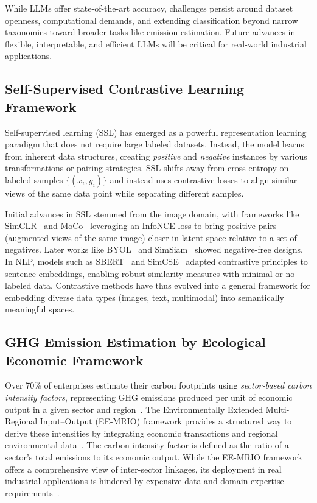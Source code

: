 While LLMs offer state-of-the-art accuracy, challenges persist around dataset openness, computational demands, and extending classification beyond narrow taxonomies toward broader tasks like emission estimation. Future advances in flexible, interpretable, and efficient LLMs will be critical for real-world industrial applications.

\subsection{Self-Supervised Contrastive Learning Framework}
Self-supervised learning (SSL) has emerged as a powerful representation learning paradigm that does not require large labeled datasets. Instead, the model learns from inherent data structures, creating \emph{positive} and \emph{negative} instances by various transformations or pairing strategies. SSL shifts away from cross-entropy on labeled samples \(\{(x_i,y_i)\}\) and instead uses contrastive losses to align similar views of the same data point while separating different samples.

Initial advances in SSL stemmed from the image domain, with frameworks like SimCLR~\cite{SimCLR} and MoCo~\cite{MoCo} leveraging an InfoNCE loss to bring positive pairs (augmented views of the same image) closer in latent space relative to a set of negatives. Later works like BYOL~\cite{contractiveBYOL} and SimSiam~\cite{Siamese} showed negative-free designs. In NLP, models such as SBERT~\cite{reimers2019sentence} and SimCSE~\cite{gao2021simcse} adapted contrastive principles to sentence embeddings, enabling robust similarity measures with minimal or no labeled data. Contrastive methods have thus evolved into a general framework for embedding diverse data types (images, text, multimodal) into semantically meaningful spaces.

\subsection{GHG Emission Estimation by Ecological Economic Framework}
Over 70\% of enterprises estimate their carbon footprints using \emph{sector-based carbon intensity factors}, representing GHG emissions produced per unit of economic output in a given sector and region~\cite{dumit2024atlas}. The Environmentally Extended Multi-Regional Input–Output (EE-MRIO) framework provides a structured way to derive these intensities by integrating economic transactions and regional environmental data~\cite{wiedmann2009review, leontief1963multiregional}. The carbon intensity factor is defined as the ratio of a sector’s total emissions to its economic output. While the EE-MRIO framework offers a comprehensive view of inter-sector linkages, its deployment in real industrial applications is hindered by expensive data and domain expertise requirements~\cite{dietzenbacher2013construction, aguiar2016overview}.